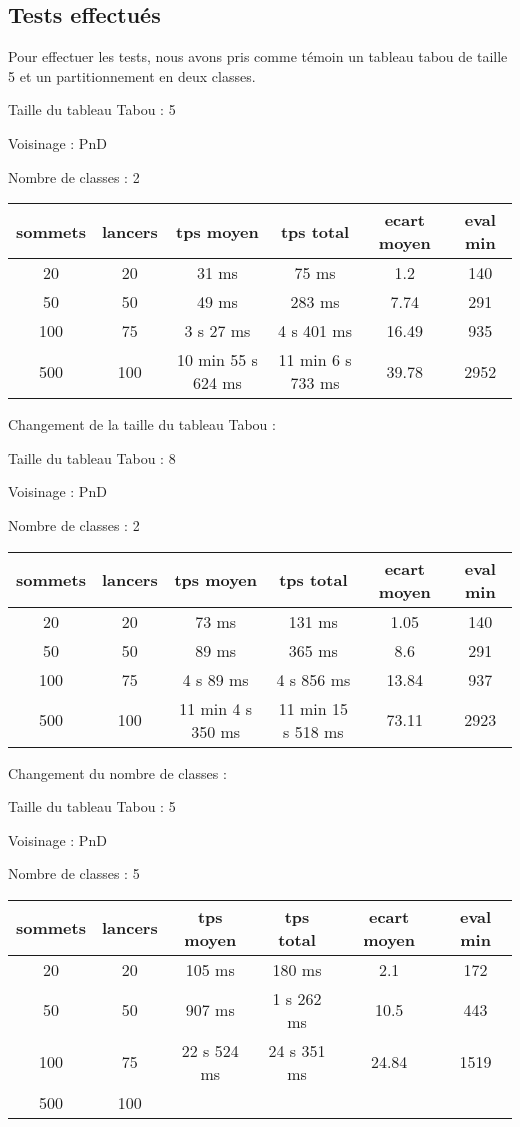 \documentclass[12pt]{article}
\begin{document}
\subsection{Tests effectués}
Pour effectuer les tests, nous avons pris comme témoin un tableau tabou de taille 5 et un partitionnement en deux classes.

\bigskip

Taille du tableau Tabou : 5

Voisinage : PnD

Nombre de classes : 2
\bigskip

\begin{tabular}{|c|c|c|c|c|c|}
	\hline 
	sommets & lancers & tps moyen & tps total & ecart moyen & eval min\\
	\hline
	20 & 20 & 31 ms & 75 ms & 1.2 & 140 \\
	\hline
	 50 & 50 & 49 ms & 283 ms & 7.74 & 291 \\
	\hline
	 100 & 75 & 3 s 27 ms & 4 s 401 ms & 16.49 & 935 \\
	\hline
	 500 & 100 & 10 min 55 s 624 ms & 11 min 6 s 733 ms & 39.78 & 2952 \\
	\hline
\end{tabular}
\bigskip

Changement de la taille du tableau Tabou :

Taille du tableau Tabou : 8

Voisinage : PnD

Nombre de classes : 2
\bigskip

\begin{tabular}{|c|c|c|c|c|c|}
	\hline 
	sommets & lancers & tps moyen & tps total & ecart moyen & eval min\\
	\hline
	20 & 20 & 73 ms & 131 ms & 1.05 & 140 \\
	\hline
	 50  &  50  &   89  ms   &  365  ms   &  8.6   &   291  \\
	\hline
	 100  &  75  &  4 s 89   ms   &  4 s  856  ms    &  13.84   &   937  \\
	\hline
	 500 & 100 & 11 min 4 s 350 ms & 11 min 15 s 518 ms & 73.11 & 2923 \\
	\hline
\end{tabular}
\bigskip

Changement du nombre de classes :

Taille du tableau Tabou : 5

Voisinage : PnD

Nombre de classes : 5
\bigskip

\begin{tabular}{|c|c|c|c|c|c|}
	\hline 
	sommets & lancers & tps moyen & tps total & ecart moyen & eval min\\
	\hline
	20 & 20 & 105 ms & 180 ms & 2.1 & 172 \\
	\hline
	 50  &  50  &   907  ms   &  1  s  262  ms   &   10.5  &   443  \\
	\hline
	 100  &  75  & 22 s 524  ms   &  24 s  351  ms    &  24.84   &   1519  \\
	\hline
	 500  &  100  &     &      &     &     \\
	\hline
\end{tabular}
\bigskip
\end{document}
